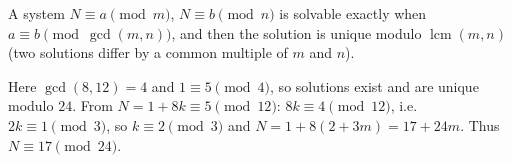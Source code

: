 A system $N\equiv a\pmod m$, $N\equiv b\pmod n$ is solvable exactly when $a\equiv b\pmod{\gcd(m,n)}$, and then the solution is unique modulo $\operatorname{lcm}(m,n)$ (two solutions differ by a common multiple of $m$ and $n$).

Here $\gcd(8,12)=4$ and $1\equiv5\pmod4$, so solutions exist and are unique modulo $24$. From $N=1+8k\equiv5\pmod{12}$: $8k\equiv4\pmod{12}$, i.e. $2k\equiv1\pmod3$, so $k\equiv2\pmod3$ and $N=1+8(2+3m)=17+24m$. Thus $\boxed{N\equiv17\pmod{24}}$.
